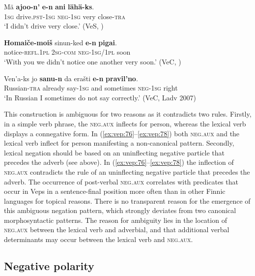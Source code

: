 \documentclass[output=paper,colorlinks=true, citecolor=brown]{langscibook}
\begin{document}
\ea\label{ex:vep:76}
    \gll Mä \textbf{ajoo-n’} \textbf{e-n} \textbf{ani} \textbf{lähä-ks}.\\
         \textsc{1sg} drive.\textsc{pst}{}-\textsc{1sg} \textsc{neg-1sg} very close{}-\textsc{tra}\\
    \glt ‘I didn’t drive very close.’ (VeS, \citealt[105]{Kettunen1920})
\z

\ea\label{ex:vep:77}
    \gll \textbf{Homaiče-moiš} sinun-ked \textbf{e-n} \textbf{pigai}.\\
         notice-\textsc{refl}.1\textsc{pl} \textsc{2sg-com} \textsc{neg-1sg}/\textsc{1pl} soon\\
    \glt ‘With you we didn't notice one another very soon.’ (VeC, \citealt[81]{MSFOu70})
\z 

\ea\label{ex:vep:78}
    \gll Ven'a-ks  jo \textbf{sanu-n} da erašti \textbf{e-n} \textbf{pravil'no}. \\
         Russian{}-\textsc{tra} already say-\textsc{1sg} and sometimes \textsc{neg-1sg} right\\
    \glt ‘In Russian I sometimes do not say correctly.’ (VeC, Ladv 2007)
\z

This construction is ambiguous for two reasons as it contradicts two rules. Firstly, in a simple verb phrase, the \textsc{neg}.\textsc{aux} inflects for person, whereas the lexical verb displays a connegative form. In (\ref{ex:vep:76}–\ref{ex:vep:78}) both \textsc{neg}.\textsc{aux} and the lexical verb inflect for person manifesting a non-canonical pattern. Secondly, lexical negation should be based on an uninflecting negative particle that precedes the adverb (see  above). In (\ref{ex:vep:76}–\ref{ex:vep:78}) the inflection of \textsc{neg}.\textsc{aux} contradicts the rule of an uninflecting negative particle that precedes the adverb. The occurrence of post-verbal \textsc{neg}.\textsc{aux} correlates with predicates that occur in Veps in a sentence-final position more often than in other Finnic languages for topical reasons. There is no transparent reason for the emergence of this ambiguous negation pattern, which strongly deviates from two canonical morphosyntactic patterns. The reason for ambiguity lies in the location of \textsc{neg}.\textsc{aux} between the lexical verb and adverbial, and that additional verbal determinants may occur between the lexical verb and \textsc{neg}.\textsc{aux}. 

\subsection{Negative polarity}\label{sec:vep:4.2}
\end{document}
